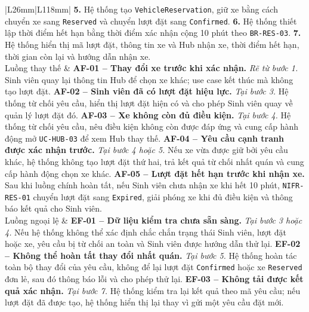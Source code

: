 \begin{longtable}{|L{26mm}|L{118mm}|}
    \textbf{5.} Hệ thống tạo \texttt{VehicleReservation}, giữ xe bằng cách chuyển xe sang \texttt{Reserved} và chuyển lượt đặt sang \texttt{Confirmed}.\newline
    \textbf{6.} Hệ thống thiết lập thời điểm hết hạn bằng thời điểm xác nhận cộng 10 phút theo \texttt{BR-RES-03}.\newline
    \textbf{7.} Hệ thống hiển thị mã lượt đặt, thông tin xe và Hub nhận xe, thời điểm hết hạn, thời gian còn lại và hướng dẫn nhận xe.\\\hline
  Luồng thay thế &
    \textbf{AF-01 -- Thay đổi xe trước khi xác nhận.} \textit{Rẽ từ bước 1.} Sinh viên quay lại thông tin Hub để chọn xe khác; use case kết thúc mà không tạo lượt đặt.\newline
    \textbf{AF-02 -- Sinh viên đã có lượt đặt hiệu lực.} \textit{Tại bước 3.} Hệ thống từ chối yêu cầu, hiển thị lượt đặt hiện có và cho phép Sinh viên quay về quản lý lượt đặt đó.\newline
    \textbf{AF-03 -- Xe không còn đủ điều kiện.} \textit{Tại bước 4.} Hệ thống từ chối yêu cầu, nêu điều kiện không còn được đáp ứng và cung cấp hành động mở \texttt{UC-HUB-03} để xem Hub thay thế.\newline
    \textbf{AF-04 -- Yêu cầu cạnh tranh được xác nhận trước.} \textit{Tại bước 4 hoặc 5.} Nếu xe vừa được giữ bởi yêu cầu khác, hệ thống không tạo lượt đặt thứ hai, trả kết quả từ chối nhất quán và cung cấp hành động chọn xe khác.\newline
    \textbf{AF-05 -- Lượt đặt hết hạn trước khi nhận xe.} Sau khi luồng chính hoàn tất, nếu Sinh viên chưa nhận xe khi hết 10 phút, \texttt{NIFR-RES-01} chuyển lượt đặt sang \texttt{Expired}, giải phóng xe khi đủ điều kiện và thông báo kết quả cho Sinh viên.\\\hline
  Luồng ngoại lệ &
    \textbf{EF-01 -- Dữ liệu kiểm tra chưa sẵn sàng.} \textit{Tại bước 3 hoặc 4.} Nếu hệ thống không thể xác định chắc chắn trạng thái Sinh viên, lượt đặt hoặc xe, yêu cầu bị từ chối an toàn và Sinh viên được hướng dẫn thử lại.\newline
    \textbf{EF-02 -- Không thể hoàn tất thay đổi nhất quán.} \textit{Tại bước 5.} Hệ thống hoàn tác toàn bộ thay đổi của yêu cầu, không để lại lượt đặt \texttt{Confirmed} hoặc xe \texttt{Reserved} đơn lẻ, sau đó thông báo lỗi và cho phép thử lại.\newline
    \textbf{EF-03 -- Không tải được kết quả xác nhận.} \textit{Tại bước 7.} Hệ thống kiểm tra lại kết quả theo mã yêu cầu; nếu lượt đặt đã được tạo, hệ thống hiển thị lại thay vì gửi một yêu cầu đặt mới.\newline

\end{longtable}
